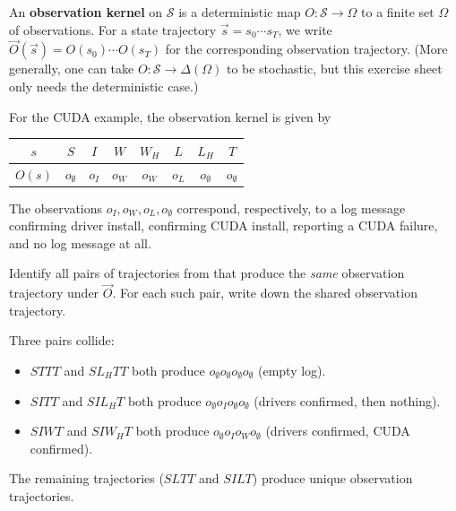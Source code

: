 \documentclass[11pt]{article}
\newcommand{\cS}{\mathcal{S}}
\begin{document}

\begin{definition}\label{def:obs}
An \textbf{observation kernel} on $\cS$ is a deterministic map
$O : \cS \to \Omega$ to a finite set $\Omega$ of observations. For a state
trajectory $\vec s = s_0 \cdots s_T$, we write
$\vec O(\vec s) = O(s_0) \cdots O(s_T)$ for the corresponding observation
trajectory. (More generally, one can take $O : \cS \to \Delta(\Omega)$ to
be stochastic, but this exercise sheet only needs the deterministic case.)
\end{definition}

For the CUDA example, the observation kernel is given by
\begin{center}
\begin{tabular}{c|ccccccc}
$s$ & $S$ & $I$ & $W$ & $W_H$ & $L$ & $L_H$ & $T$ \\\hline
$O(s)$ & $o_\emptyset$ & $o_I$ & $o_W$ & $o_W$ & $o_L$ & $o_\emptyset$ & $o_\emptyset$
\end{tabular}
\end{center}
The observations $o_I, o_W, o_L, o_\emptyset$ correspond, respectively, to a
log message confirming driver install, confirming CUDA install, reporting a
CUDA failure, and no log message at all.


\begin{exercise}
\label{prob:obsclasses}
Identify all pairs of trajectories from
 that produce the \emph{same} observation trajectory under
$\vec O$. For each such pair, write down the shared observation trajectory.
\end{exercise}

\begin{solution}
Three pairs collide:
\begin{itemize}
    \item $STTT$ and $SL_HTT$ both produce $o_\emptyset o_\emptyset o_\emptyset o_\emptyset$ (empty log).
    \item $SITT$ and $SIL_HT$ both produce $o_\emptyset o_I o_\emptyset o_\emptyset$ (drivers confirmed, then nothing).
    \item $SIWT$ and $SIW_HT$ both produce $o_\emptyset o_I o_W o_\emptyset$ (drivers confirmed, CUDA confirmed).
\end{itemize}
The remaining trajectories ($SLTT$ and $SILT$) produce unique observation
trajectories.
\end{solution}
\end{document}
